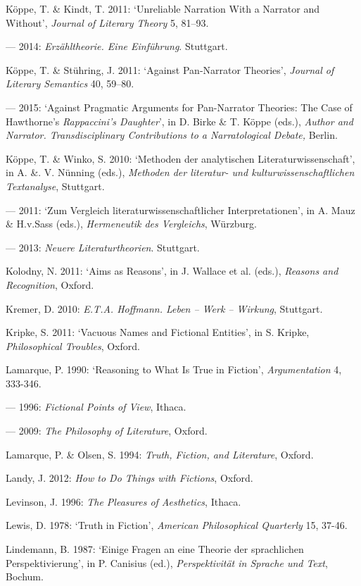 \begin{hangparas}{.5cm}{1}
K\"oppe, T. \& Kindt, T. 2011: `Unreliable Narration With a Narrator and Without', \emph{Journal of Literary Theory} 5, 81--93.

--- 2014: \emph{Erz\"ahltheorie. Eine Einf\"uhrung}. Stuttgart.

K\"oppe, T. \& St\"uhring, J. 2011: `Against Pan-Narrator Theories', \emph{Journal of Literary Semantics} 40, 59--80.

--- 2015: `Against Pragmatic Arguments for Pan-Narrator Theories: The Case of Hawthorne's \emph{Rappaccini's Daughter}', in D. Birke \& T. K\"oppe (eds.), \emph{Author and Narrator. Transdisciplinary Contributions to a Narratological Debate,} Berlin.

K\"oppe, T. \& Winko, S. 2010: `Methoden der analytischen Literaturwissenschaft', in A. \&. V. N\"unning (eds.), \emph{Methoden der literatur- und kulturwissenschaftlichen Textanalyse}, Stuttgart.

--- 2011: `Zum Vergleich literaturwissenschaftlicher Interpretationen', in A. Mauz \& H.v.Sass (eds.), \emph{Hermeneutik des Vergleichs}, W\"urzburg.

--- 2013: \emph{Neuere Literaturtheorien}. Stuttgart.

Kolodny, N. 2011: `Aims as Reasons', in J. Wallace et al. (eds.), \emph{Reasons and Recognition}, Oxford.

Kremer, D. 2010: \emph{E.T.A. Hoffmann. Leben -- Werk -- Wirkung}, Stuttgart.

Kripke, S. 2011: `Vacuous Names and Fictional Entities', in S. Kripke, \emph{Philosophical Troubles}, Oxford.

Lamarque, P. 1990: `Reasoning to What Is True in Fiction', \emph{Argumentation} 4, 333-346.

--- 1996: \emph{Fictional Points of View}, Ithaca. 

--- 2009: \emph{The Philosophy of Literature}, Oxford. 

Lamarque, P. \& Olsen, S. 1994: \emph{Truth, Fiction, and Literature}, Oxford.

Landy, J. 2012: \emph{How to Do Things with Fictions}, Oxford.

Levinson, J. 1996: \emph{The Pleasures of Aesthetics}, Ithaca.

Lewis, D. 1978: `Truth in Fiction', \emph{American Philosophical Quarterly} 15, 37-46.

Lindemann, B. 1987: `Einige Fragen an eine Theorie der sprachlichen Perspektivierung', in P. Canisius (ed.), \emph{Perspektivit\"at in Sprache und Text}, Bochum.


\end{hangparas}
